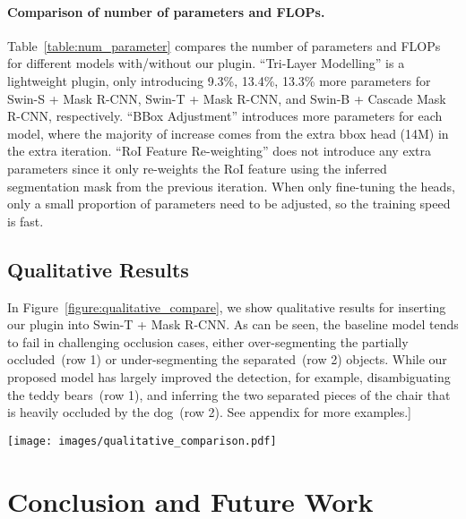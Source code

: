 \documentclass{bmvc2k}
\begin{document}
\paragraph{Comparison of number of parameters and FLOPs.}
Table~\ref{table:num_parameter} compares the number of parameters and FLOPs for different models with/without our plugin. ``Tri-Layer Modelling'' is a lightweight plugin, only introducing 9.3\%, 13.4\%, 13.3\% more parameters for Swin-S + Mask R-CNN, Swin-T + Mask R-CNN, and Swin-B + Cascade Mask R-CNN, respectively.
``BBox Adjustment'' introduces more parameters for each model, where the majority of increase comes from the extra bbox head (14M) in the extra iteration. ``RoI Feature Re-weighting'' does not introduce any extra parameters since it only re-weights the RoI feature using the inferred segmentation mask from the previous iteration. When only fine-tuning the heads, only a small proportion of parameters need to be adjusted, so the training speed is fast. 




\subsection{Qualitative Results}
\label{qualitative_results}

In Figure~\ref{figure:qualitative_compare}, 
we show qualitative results for inserting our plugin into Swin-T + Mask R-CNN.
As can be seen, the baseline model tends to fail in challenging occlusion cases, 
either over-segmenting the partially occluded~(row 1) or under-segmenting the separated~(row 2) objects.
While our proposed model has largely improved the detection, 
for example, disambiguating the teddy bears~(row 1), 
and inferring the two separated pieces of the chair that is heavily occluded by the dog~(row 2). See appendix for more examples.\-0.7cm]



\begin{figure*}[!htb]
		\centering
		\texttt{[image: images/qualitative\_comparison.pdf]}
		\vspace{-6mm}
		\caption{\textcolor{bmvc_blue}{\textbf{Qualitative results on COCO.} 
		Please see the text for more discussion. More qualitative results are provided in appendix.
  }}
		\label{figure:qualitative_compare}
 		\vspace{-6mm}
\end{figure*}
 \vspace{-0.3cm}
\section{Conclusion and Future Work}
\vspace{-0.1cm}
\end{document}
